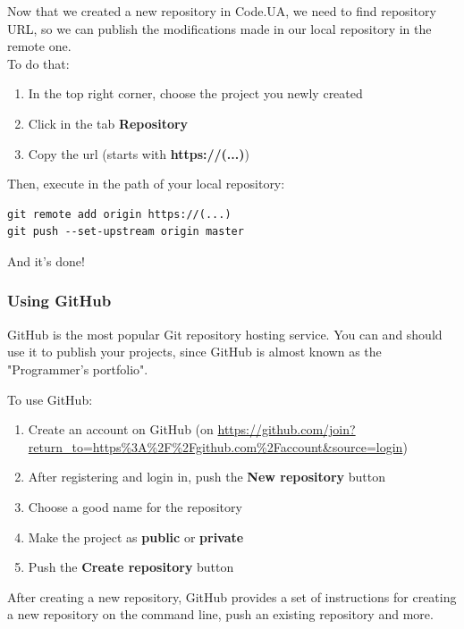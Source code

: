 \documentclass{article}
\begin{document}
Now that we created a new repository in Code.UA, we need to find repository URL, so we can publish the modifications made in our local repository in the\underline{} remote one.\\

To do that:

\begin{enumerate}
\item In the top right corner, choose the project you newly created
\item Click in the tab \textbf{Repository}
\item Copy the url (starts with \textbf{https://(...)\underline{}})
\end{enumerate}

Then, execute in the path of your local repository:

\begin{lstlisting}
git remote add origin https://(...)
git push --set-upstream origin master
\end{lstlisting}

And it's done!

\subsubsection{Using GitHub}

GitHub is the most popular Git repository hosting service. You can and should use it to publish your projects, since GitHub is almost known as the "Programmer's portfolio".

To use GitHub:

\begin{enumerate}
\item Create an account on GitHub (on \url{https://github.com/join?return_to=https%3A%2F%2Fgithub.com%2Faccount&source=login})
\item After registering and login in, push the \textbf{New repository} button
\item Choose a good name for the repository
\item Make the project as \textbf{public} or \textbf{private}
\item Push the \textbf{Create repository} button
\end{enumerate}

After creating a new repository, GitHub provides a set of instructions for creating a new repository on the command line, push an existing repository and more.\\
\end{document}
